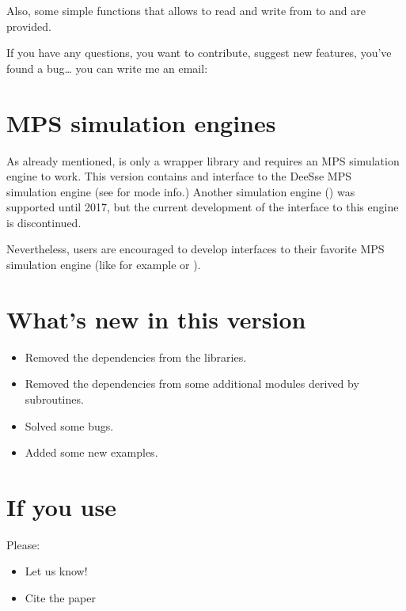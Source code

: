 \documentclass[letterpaper,10pt,english]{sphinxmanual}
\begin{document}
Also, some simple functions that allows to read and write from 
to  and  are provided.

If you have any questions, you want to contribute, suggest new
features, you’ve found a bug…  you can write me an e\sphinxhyphen{}mail:


\section{MPS simulation engines}
\label{\detokenize{purpose:mps-simulation-engines}}
As already mentioned,  is only a wrapper library and requires
an MPS simulation engine to work.  This version contains and interface
to the DeeSse MPS simulation engine (see  for mode info.)  Another
simulation engine () was supported until 2017, but the current
development of the interface to this engine is discontinued.

Nevertheless, users are encouraged to develop interfaces to their
favorite MPS simulation engine (like for example  or ).


\section{What’s new in this version}
\label{\detokenize{purpose:what-s-new-in-this-version}}\begin{itemize}
\item {} 
Removed the dependencies from the  libraries.

\item {} 
Removed the dependencies from some additional modules derived by
 subroutines.

\item {} 
Solved some bugs.

\item {} 
Added some new examples.

\end{itemize}


\section{If you use }
\label{\detokenize{purpose:if-you-use-s2dcd}}
Please:
\begin{itemize}
\item {} 
Let us know!

\item {} 
Cite the paper 

\end{itemize}
\end{document}
